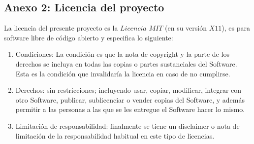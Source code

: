 \subsection{Anexo 2: Licencia del proyecto}\label{anexo2:license}
La licencia del presente proyecto es la \(Licencia\) \(MIT\) (en su versión \(X11\)), es para software libre de código abierto y especifica lo siguiente:
\begin{enumerate}
	\item Condiciones: La condición es que la nota de copyright y la parte de los derechos se incluya en todas las copias o partes sustanciales del Software. Esta es la condición que invalidaría la licencia en caso de no cumplirse.
	\item Derechos: sin restricciones; incluyendo usar, copiar, modificar, integrar con otro Software, publicar, sublicenciar o vender copias del Software, y además permitir a las personas a las que se les entregue el Software hacer lo mismo.
	\item Limitación de responsabilidad: finalmente se tiene un disclaimer o nota de limitación de la responsabilidad habitual en este tipo de licencias.
\end{enumerate}



